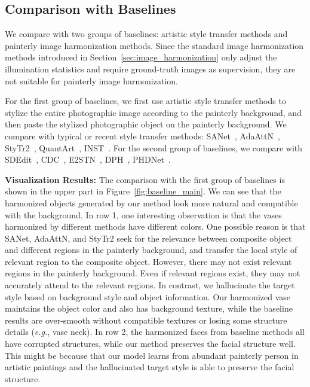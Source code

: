 \documentclass[letterpaper]{article} %
\begin{document}
\subsection{Comparison with Baselines} \label{sec:cmp_with_baseline}

We compare with two groups of baselines: artistic style transfer methods and painterly image harmonization methods.  Since the standard image harmonization methods introduced in Section~\ref{sec:image_harmonization} only adjust the illumination statistics and require ground-truth images as supervision, they are not suitable for painterly image harmonization.

For the first group of baselines, we first use artistic style transfer methods to stylize the entire photographic image according to the painterly background, and then paste the stylized photographic object on the painterly background.
We compare with typical or recent style transfer methods: SANet~\cite{park2019arbitrary}, AdaAttN~\cite{liu2021adaattn},  StyTr2~\cite{deng2022stytr2}, QuantArt~\cite{quantart}, INST~\cite{inst}.
For the second group of baselines, we compare with SDEdit~\cite{sdedit}, CDC~\cite{cdc}, E2STN~\cite{peng2019element}, DPH~\cite{luan2018deep}, PHDNet~\cite{cao2022painterly}.

\textbf{Visualization Results:} The comparison with the first group of baselines is shown in the upper part in Figure~\ref{fig:baseline_main}. We can see that the harmonized objects generated by our method look more natural and compatible with the background. In row 1, one interesting observation is that the vases harmonized by different methods have different colors. One possible reason is that SANet, AdaAttN, and StyTr2 seek for the relevance between composite object and different regions in the painterly background, and transfer the local style of relevant region to the composite object. However, there may not exist relevant regions in the painterly background. Even if relevant regions exist, they may not accurately attend to the relevant regions. In contrast, we hallucinate the target style based on background style and object information. Our harmonized vase maintains the object color and also has background texture, while the baseline results are over-smooth without compatible textures or losing some structure details (\emph{e.g.}, vase neck). In row 2, the harmonized faces from baseline methods all have corrupted structures, while our method preserves the facial structure well. This might be because that our model learns from abundant painterly person in artistic paintings and the hallucinated target style is able to preserve the facial structure.
\end{document}
